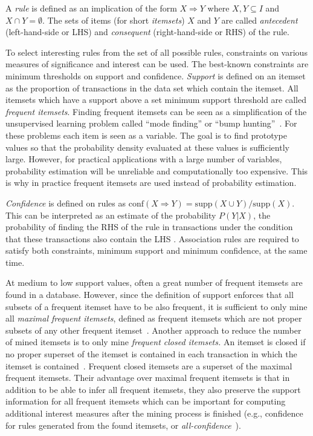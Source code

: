 \documentclass[10pt,a4paper]{article}
\begin{document}
A \emph{rule} is defined as an implication of the form $X \Rightarrow Y$
where $X, Y \subseteq I$ and $X \cap Y = \emptyset$.  The sets of items
(for short \emph{itemsets}) $X$ and $Y$ are called \emph{antecedent}
(left-hand-side or LHS) and \emph{consequent} (right-hand-side or RHS)
of the rule.

To select interesting rules from the set of all possible rules,
constraints on various measures of significance and interest can be
used.  The best-known constraints are minimum thresholds on support and
confidence.  \emph{Support} is defined on an itemset as the proportion
of transactions in the data set which contain the itemset.  All itemsets
which have a support above a set minimum support threshold are called
\emph{frequent itemsets}.  
Finding frequent itemsets can be seen as a simplification of
the unsupervised learning problem called
``mode finding'' or 
``bump hunting''~\citep{arules:Hastie+Tibshirani+Friedman:2001}.
For these problems each item is seen as a variable.
The goal is to find
prototype values so that the probability density
evaluated at these values is sufficiently large.
However, for practical applications with a large number of variables, 
probability estimation will be unreliable and computationally too expensive.
This is why in practice frequent itemsets are used instead of 
probability estimation.

\emph{Confidence} is defined on rules as $\mathrm{conf}(X\Rightarrow Y)
= \mathrm{supp}(X \cup Y) / \mathrm{supp}(X)$.  This can be interpreted
as an estimate of the probability $P(Y|X)$, the probability of finding
the RHS of the rule in transactions under the condition that these
transactions also contain the LHS 
\citep[see e.g.,][]{arules:Hipp+Guentzer+Nakhaeizadeh:2000}.  
Association rules are
required to satisfy both constraints, minimum support and
minimum confidence, at the same time.

At medium to low support values, often a great number of frequent
itemsets are found in a database.  However, since the definition of
support enforces that all subsets of a frequent itemset have to be also
frequent, it is sufficient to only mine all \emph{maximal frequent
  itemsets}, defined as frequent itemsets which are not proper subsets
of any other frequent
itemset~\citep{arules:Zaki+Parthasarathy+Ogihara+Li:1997}.  Another
approach to reduce the number of mined itemsets is to only mine
\emph{frequent closed itemsets.}  An itemset is closed if no proper
superset of the itemset is contained in each transaction in which the
itemset is contained~\citep{arules:Pasquier+Bastide+Taouil+Lakhal:1999,
  arules:Zaki:2004}.  Frequent closed itemsets are a superset of the
maximal frequent itemsets.  Their advantage over maximal frequent
itemsets is that in addition to be able to infer all frequent itemsets,
they also preserve the support information for all frequent itemsets
which can be important for computing additional interest measures after
the mining process is finished (e.g., confidence for rules
generated from the found itemsets, or 
\emph{all-confidence}~\citep{arules:Omiecinski:2003}).
\end{document}
